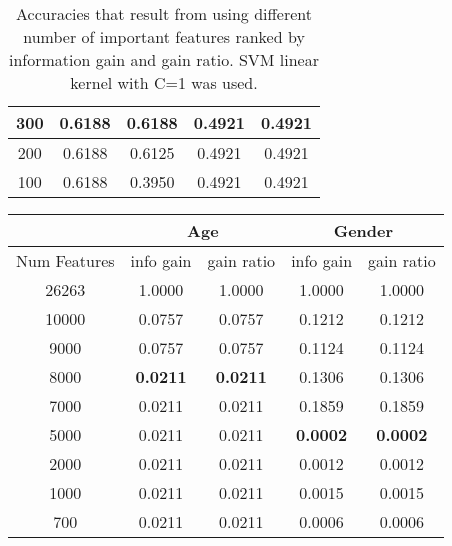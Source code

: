 \documentclass[a4paper]{llncs}
\begin{document}
\begin{table}[!htbp]
\begin{tabular}{|c|c|c|c|c|}
300                                & 0.6188     & 0.6188      & 0.4921       & 0.4921       \\ \hline
200                                & 0.6188     & 0.6125      & 0.4921       & 0.4921       \\ \hline
100                                & 0.6188     & 0.3950      & 0.4921       & 0.4921       \\ \hline
\end{tabular}
\caption{Accuracies that result from using different number of important features ranked by information gain and gain ratio. SVM linear kernel with C=1 was used.}
\label{table:ChoosingNumFeatures}
\end{table}



\begin{table}[!htbp]
\centering
\begin{tabular}{|c|c|c|c|c|}
\hline
                                   & \multicolumn{2}{c|}{Age}          & \multicolumn{2}{c|}{Gender}       \\ \hline
\multicolumn{1}{|l|}{Num Features} & info gain       & gain ratio      & info gain       & gain ratio      \\ \hline
26263                              & 1.0000          & 1.0000          & 1.0000          & 1.0000          \\ \hline
10000                              & 0.0757          & 0.0757          & 0.1212          & 0.1212          \\ \hline
9000                               & 0.0757          & 0.0757          & 0.1124          & 0.1124          \\ \hline
8000                               & \textbf{0.0211} & \textbf{0.0211} & 0.1306          & 0.1306          \\ \hline
7000                               & 0.0211          & 0.0211          & 0.1859          & 0.1859          \\ \hline
5000                               & 0.0211          & 0.0211          & \textbf{0.0002} & \textbf{0.0002} \\ \hline
2000                               & 0.0211          & 0.0211          & 0.0012          & 0.0012          \\ \hline
1000                               & 0.0211          & 0.0211          & 0.0015          & 0.0015          \\ \hline
700                                & 0.0211          & 0.0211          & 0.0006          & 0.0006          \\ \hline

\end{tabular}
\end{table}
\end{document}
